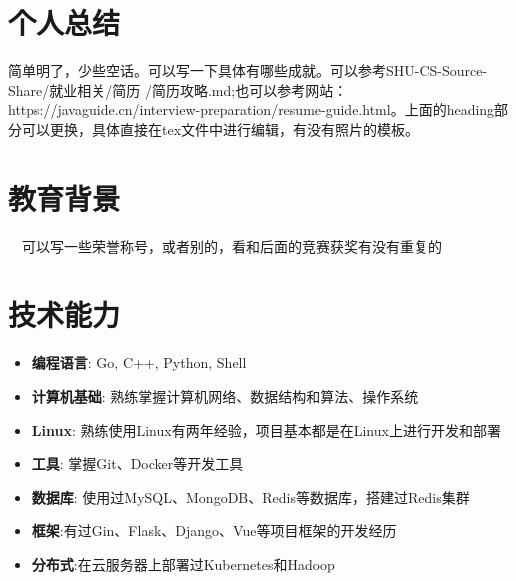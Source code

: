 \documentclass{resume}
\begin{document}



\section{个人总结}
简单明了，少些空话。可以写一下具体有哪些成就。可以参考SHU-CS-Source-Share/就业相关/简历
/简历攻略.md;也可以参考网站：https://javaguide.cn/interview-preparation/resume-guide.html。上面的heading部分可以更换，具体直接在tex文件中进行编辑，有没有照片的模板。

\section{教育背景}
\ \ 可以写一些荣誉称号，或者别的，看和后面的竞赛获奖有没有重复的

\section{技术能力}
\begin{itemize}[parsep=0.5ex]
  \item \textbf{编程语言}: Go, C++, Python, Shell
  \item \textbf{计算机基础}: 熟练掌握计算机网络、数据结构和算法、操作系统
  \item \textbf{Linux}: 熟练使用Linux有两年经验，项目基本都是在Linux上进行开发和部署
  \item \textbf{工具}: 掌握Git、Docker等开发工具
  \item \textbf{数据库}: 使用过MySQL、MongoDB、Redis等数据库，搭建过Redis集群
  \item \textbf{框架}:有过Gin、Flask、Django、Vue等项目框架的开发经历
  \item \textbf{分布式}:在云服务器上部署过Kubernetes和Hadoop
\end{itemize}
\end{document}
